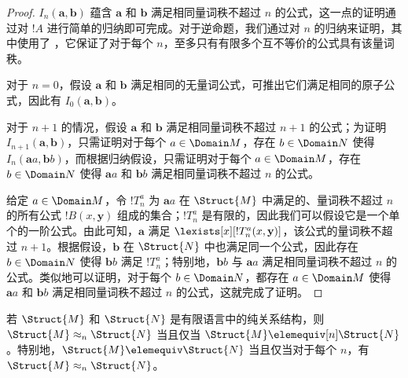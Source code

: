 \documentclass[../../../include/open-logic-section]{subfiles}
\begin{document}
\begin{proof}
  $I_n(\mathbf{a},\mathbf{b})$ 蕴含 $\mathbf{a}$ 和 $\mathbf{b}$ 满足相同量词秩不超过 $n$ 的公式，这一点的证明通过对 $!A$ 进行简单的归纳即可完成。对于逆命题，我们通过对 $n$ 的归纳来证明，其中使用了 ，它保证了对于每个 $n$，至多只有有限多个互不等价的公式具有该量词秩。

  对于 $n=0$，假设 $\mathbf{a}$ 和 $\mathbf{b}$ 满足相同的无量词公式，可推出它们满足相同的原子公式，因此有 $I_0(\mathbf{a},\mathbf{b})$。

  对于 $n+1$ 的情况，假设 $\mathbf{a}$ 和 $\mathbf{b}$ 满足相同量词秩不超过 $n+1$ 的公式；为证明 $I_{n+1}(\mathbf{a},\mathbf{b})$，只需证明对于每个 $a \in \Domain M$，存在 $b \in \Domain N$ 使得 $I_n(\mathbf{a}a,\mathbf{b}b)$，而根据归纳假设，只需证明对于每个 $a \in \Domain M$，存在 $b \in \Domain N$ 使得 $\mathbf{a}a$ 和 $\mathbf{b}b$ 满足相同量词秩不超过 $n$ 的公式。

  给定 $a \in \Domain M$，令 $!T^a_n$ 为 $\mathbf{a}a$ 在 $\Struct{M}$ 中满足的、量词秩不超过 $n$ 的所有公式 $!B(x,\mathbf{y})$ 组成的集合；$!T^a_n$ 是有限的，因此我们可以假设它是一个单个的一阶公式。由此可知，$\mathbf{a}$ 满足 $\lexists[x][!T^a_n(x,\mathbf{y})]$，该公式的量词秩不超过 $n+1$。根据假设，$\mathbf{b}$ 在 $\Struct{N}$ 中也满足同一个公式，因此存在 $b \in \Domain N$ 使得 $\mathbf{b}b$ 满足 $!T^a_n$；特别地，$\mathbf{b}b$ 与 $\mathbf{a}a$ 满足相同量词秩不超过 $n$ 的公式。类似地可以证明，对于每个 $b \in \Domain N$，都存在 $a\in \Domain M$ 使得 $\mathbf{a}a$ 和 $\mathbf{b}b$ 满足相同量词秩不超过 $n$ 的公式，这就完成了证明。
\end{proof}

\begin{cor}
  若 $\Struct{M}$ 和 $\Struct{N}$ 是有限语言中的纯关系结构，则 $\Struct{M} \approx_n\Struct{N}$ 当且仅当 $\Struct{M} \elemequiv[n] \Struct{N}$。特别地，$\Struct{M} \elemequiv \Struct{N}$ 当且仅当对于每个 $n$，有 $\Struct{M} \approx_n \Struct{N}$。
\end{cor}
\end{document}
